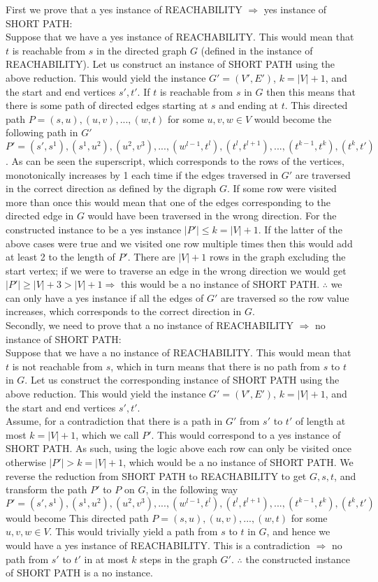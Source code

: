 \documentclass[12pt]{article}
\begin{document}
\begin{enumerate}
\begin{enumerate}
First we prove that a yes instance of REACHABILITY $\Rightarrow $ yes instance of SHORT PATH:\\
Suppose that we have a yes instance of REACHABILITY. This would mean that $t$ is reachable from $s$ in the directed graph $G$ (defined in the instance of REACHABILITY). Let us construct an instance of SHORT PATH using the above reduction. This would yield the instance $G'=(V',E')$, $k=|V|+1$, and the start and end vertices $s',t'$. If $t$ is reachable from $s$ in $G$ then this means that there is some path of directed edges starting at $s$ and ending at $t$. This directed path $P=(s,u),(u,v),...,(w,t)$ for some $u,v,w \in V$ would become the following path in $G'$ $P'=(s',s^1),(s^1,u^2),(u^2,v^3),...,(w^{l-1},t^l),(t^l,t^{l+1}),...,(t^{k-1},t^k),(t^k,t')$. As can be seen the superscript, which corresponds to the rows of the vertices, monotonically increases by 1 each time if the edges traversed in $G'$ are traversed in the correct direction as defined by the digraph $G$. If some row were visited more than once this would mean that one of the edges corresponding to the directed edge in $G$ would have been traversed in the wrong direction. For the constructed instance to be a yes instance $|P'|\leq k =|V|+1$. If the latter of the above cases were true and we visited one row multiple times then this would add at least 2 to the length of $P'$. There are $|V|+1$ rows in the graph excluding the start vertex; if we were to traverse an edge in the wrong direction we would get $|P'| \geq |V|+3 > |V|+1 \Rightarrow$ this would be a no instance of SHORT PATH. $\therefore$ we can only have a yes instance if all the edges of $G'$ are traversed so the row value increases, which corresponds to the correct direction in $G$. \\
Secondly, we need to prove that a no instance of REACHABILITY $\Rightarrow$ no instance of SHORT PATH: \\
Suppose that we have a no instance of REACHABILITY. This would mean that $t$ is not reachable from $s$, which in turn means that there is no path from $s$ to $t$ in $G$. Let us construct the corresponding instance of SHORT PATH using the above reduction. This would yield the instance $G'=(V',E')$, $k=|V|+1$, and the start and end vertices $s',t'$. \\
Assume, for a contradiction that there is a path in $G'$ from $s'$ to $t'$ of length at most $k=|V|+1$, which we call $P'$. This would correspond to a yes instance of SHORT PATH. As such, using the logic above each row can only be visited once otherwise $|P'|>k=|V|+1$, which would be a no instance of SHORT PATH. We reverse the reduction from SHORT PATH to REACHABILITY to get $G,s,t$, and transform the path $P'$ to $P$ on $G$, in the following way $P'=(s',s^1),(s^1,u^2),(u^2,v^3),...,(w^{l-1},t^l),(t^l,t^{l+1}),...,(t^{k-1},t^k),(t^k,t')$ would become This directed path $P=(s,u),(u,v),...,(w,t)$ for some $u,v,w \in V$. This would trivially yield a path from $s$ to $t$ in $G$, and hence we would have a yes instance of REACHABILITY. This is a contradiction $\Rightarrow$  no path from $s'$ to $t'$ in at most $k$ steps in the graph $G'$. $\therefore$ the constructed instance of SHORT PATH is a no instance.\\

\end{enumerate}
\end{enumerate}
\end{document}
